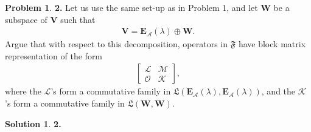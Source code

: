 \documentclass{article}
\theoremstyle{definition}
\newtheorem*{prob*}{Problem}
\newtheorem*{sln*}{Solution}
\newcommand{\V}{\mathbf{V}}
\newcommand{\W}{\mathbf{W}}
\newcommand{\A}{\mathcal{A}}
\newcommand{\lag}{\mathcal{L}}
\newcommand{\M}{\mathcal{M}}
\begin{document}
\begin{prob*}\textbf{2.} Let us use the same set-up as in Problem 1, and let $\W$ be a subspace of $\V$ such that 
	\begin{align*}
	\V = \textbf{E}_\A(\lambda) \oplus\W.
	\end{align*}
	Argue that with respect to this decomposition, operators in $\mathfrak{F}$ have block matrix representation of the form
	\begin{align*}
	\begin{bmatrix}
	\lag & \M \\
	\mathcal{O} & \mathcal{K}
	\end{bmatrix},
	\end{align*}
	where the $\lag$'s form a commutative family in $\mathfrak{L}(\textbf{E}_\A(\lambda), \textbf{E}_\A(\lambda))$, and the $\mathcal{K}$'s form a commutative family in $\mathfrak{L}(\W,\W)$. 
	
	\begin{sln*}\textbf{2.}\\
		

\end{sln*}
\end{prob*}
\end{document}

